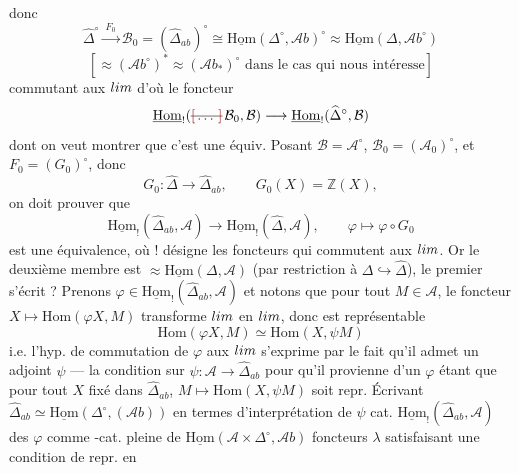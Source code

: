\documentclass[11pt,a4paper]{article}
\begin{document}
donc
\[
  \widehat{\Delta}^{\circ} \xrightarrow{\ F_{0}\ } \mathcal{B}_{0} = (\widehat{\Delta}_{ab})^{\circ}
  \cong \underline{\mathrm{Hom}}(\Delta^{\circ}, \mathcal{A}b)^{\circ}
  \approx \underline{\mathrm{Hom}}(\Delta, \mathcal{A}b^{\circ})
\]
\[
  [\approx (\mathcal{A}b^{\circ})^{*} \approx (\mathcal{A}b_{*})^{\circ} \text{ dans le cas qui nous intéresse}]
\]
commutant aux $\varinjlim$ d'où le foncteur
\[
  \underline{\mathrm{Hom}}_{!}(\text{\struck{\ill{}}}\,\mathcal{B}_{0}, \mathcal{B}) \longrightarrow \underline{\mathrm{Hom}}_{!}(\widehat{\Delta}^{\circ}, \mathcal{B})
\]
 dont on veut montrer que c'est une équiv. Posant
$\mathcal{B} = \mathcal{A}^{\circ}$, $\mathcal{B}_{0} = (\mathcal{A}_{0})^{\circ}$, et
$F_{0} = (G_{0})^{\circ}$, donc
\[
  G_{0} : \widehat{\Delta} \to \widehat{\Delta}_{ab}, \qquad G_{0}(X) = \mathbb{Z}(X),
\]
on doit prouver que
\[
  \underline{\mathrm{Hom}}_{!}(\widehat{\Delta}_{ab}, \mathcal{A}) \longrightarrow \underline{\mathrm{Hom}}_{!}(\widehat{\Delta}, \mathcal{A}),
  \qquad \varphi \longmapsto \varphi \circ G_{0}
\]
est une équivalence, où $!$ désigne les foncteurs qui commutent aux $\varinjlim$. Or le
deuxième membre est $\approx \underline{\mathrm{Hom}}(\Delta, \mathcal{A})$ (par
restriction à $\Delta \hookrightarrow \widehat{\Delta}$),  le premier
s'écrit ?  Prenons $\varphi \in \underline{\mathrm{Hom}}_{!}(\widehat{\Delta}_{ab}, \mathcal{A})$
et notons que pour tout $M \in \mathcal{A}$,  le foncteur
$X \mapsto \mathrm{Hom}(\varphi X, M)$ transforme $\varinjlim$ en $\varprojlim$, donc
est représentable
\[
  \mathrm{Hom}(\varphi X, M) \simeq \mathrm{Hom}(X, \psi M)
\]
i.e. l'hyp. de commutation de $\varphi$ aux $\varinjlim$ s'exprime par le fait qu'il
admet un adjoint $\psi$ --- la condition   sur
\struck{\ill{}} $\psi : \mathcal{A} \to \widehat{\Delta}_{ab}$ pour qu'il provienne
d'un $\varphi$ étant que pour tout $X$ fixé dans $\widehat{\Delta}_{ab}$,
$M \mapsto \mathrm{Hom}(X, \psi M)$ soit repr. Écrivant
$\widehat{\Delta}_{ab} \simeq \underline{\mathrm{Hom}}(\Delta^{\circ}, (\mathcal{A}b))$
en termes d'interprétation de $\psi$  cat.
$\underline{\mathrm{Hom}}_{!}(\widehat{\Delta}_{ab}, \mathcal{A})$ des $\varphi$ comme
-cat. pleine de $\underline{\mathrm{Hom}}(\mathcal{A} \times \Delta^{\circ}, \mathcal{A}b)$
 foncteurs $\lambda$ satisfaisant une condition de repr.  en
\end{document}
